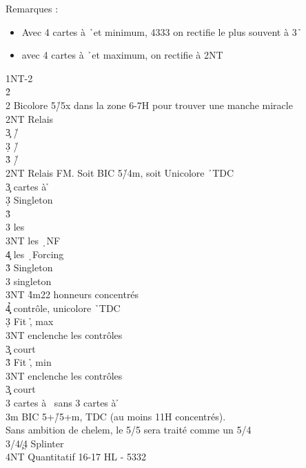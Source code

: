 \documentclass[a4paper]{article}
\begin{document}
Remarques :

\begin{itemize}
\item Avec 4 cartes à \h\ et minimum, 4333 on rectifie le plus souvent à 3\h\ 

\item avec 4 cartes à \h\ et maximum, on rectifie à 2NT

\end{itemize}

\begin{bidtable}
1NT-2\d\\
2\h\+\\
2\s \> Bicolore 5\h /5x dans la zone 6-7H pour trouver une manche miracle\+\\
2NT \> Relais\+\\
3\c \> \h /\c \\
3\d \> \h /\d \\
3\h \> \h /\s \-\-\\
2NT \> Relais FM. Soit BIC 5\h /4m, soit Unicolore \h\ TDC\+\\
3\c {} cartes à \h \+\\
3\d \> Singleton \s \+\\
3\h\+\\
3\s \> les \c \\
3NT \> les \d\ NF\\
4\c \> les \d\ Forcing\-\-\\
3\h \> Singleton \c \\
3\s \> singleton \d \\
3NT \h 4m22 honneurs concentrés\\
4\c\d\h \> contrôle, unicolore \h\ TDC\-\\
3\d \> Fit \h , max\+\\
3NT \> enclenche les contrôles\\
3\c\d \> court\-\\
3\h \> Fit \h , min\+\\
3NT \> enclenche les contrôles\\
3\c\d \> court\-\\
3\s {} cartes à \s\ sans 3 cartes à \h \-\\
3m \> BIC 5+\h /5+m, TDC (au moins 11H concentrés).\\
\>Sans ambition de chelem, le 5/5 sera traité comme un 5/4\\
3\s/4\c/4\d \> Splinter\\
4NT \> Quantitatif 16-17 HL - 5332\-
\end{bidtable}
\end{document}
